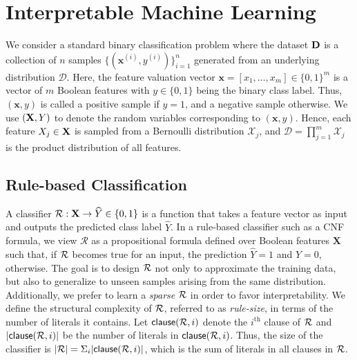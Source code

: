 \section{Interpretable Machine Learning}
\label{chapter_interpretability_preliminaries}
We consider a standard binary classification problem where the dataset $ \mathbf{D} $ is a collection of $ n $ samples  $\{(\mathbf{x}^{(i)}, y^{(i)})\}_{i=1}^n$ generated from an underlying distribution $\mathcal{D}$.  Here, the feature valuation vector $ \mathbf{x} = [x_1, \dots, x_{m}] \in \{0, 1\}^m $ is a vector of $ m $ Boolean features with $ y \in \{0,1\} $ being the binary class label. Thus, $ (\mathbf{x}, y) $ is called a positive sample if $ y = 1 $, and a negative sample otherwise.  We use $ (\mathbf{X}, Y) $ to denote the random variables corresponding to $ (\mathbf{x}, y) $. Hence, each feature $ X_j \in \mathbf{X} $ is sampled from a Bernoulli distribution $ \mathcal{X}_j $, and $ \mathcal{D} = \prod_{j=1}^m \mathcal{X}_j  $ is the product distribution of all features. 






\subsection{Rule-based Classification}
A classifier $ {\mathcal{R}}: \mathbf{X} \rightarrow \widehat{Y} \in  \{0,1\} $ is a  function that takes a feature vector as input and outputs the predicted class label $\widehat{Y}$.  %
In a rule-based classifier such as a CNF formula, we view $ \mathcal{R} $ as a propositional formula defined over Boolean features $ \mathbf{X} $ such that, if $ {\mathcal{R}} $ becomes true for an input, the prediction $ \widehat{Y} = 1 $ and $ \widehat{Y} = 0 $, otherwise.  The goal is to design ${\mathcal{R}}$ not only to approximate the training data, but also to generalize to unseen samples arising from the same distribution. Additionally, we prefer to learn a \emph{sparse} $ {\mathcal{R}} $ in order to favor interpretability. We define the structural complexity of $ {\mathcal{R}} $, referred to as \emph{rule-size}, in terms of the number of literals it contains. Let $\mathsf{clause}({\mathcal{R}},i)$ denote  the  $i^\text{th}$ clause of ${\mathcal{R}}$ and $ |\mathsf{clause}({\mathcal{R}},i)| $ be  the number of literals in $\mathsf{clause}({\mathcal{R}},i)$. Thus, the size of the classifier is $|{\mathcal{R}}| =  \Sigma_i |\mathsf{clause}({\mathcal{R}},i)| $, which is the sum of literals in all clauses in $ {\mathcal{R}} $. 

